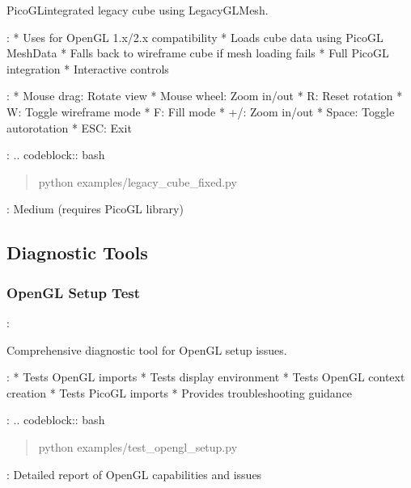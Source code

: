 \documentclass[a4paper,10pt,english,openany,oneside]{sphinxmanual}
\begin{document}
\sphinxAtStartPar
PicoGL\sphinxhyphen{}integrated legacy cube using LegacyGLMesh.

\sphinxAtStartPar
{}:
* Uses  for OpenGL 1.x/2.x compatibility
* Loads cube data using PicoGL MeshData
* Falls back to wireframe cube if mesh loading fails
* Full PicoGL integration
* Interactive controls

\sphinxAtStartPar
{}:
* Mouse drag: Rotate view
* Mouse wheel: Zoom in/out
* R: Reset rotation
* W: Toggle wireframe mode
* F: Fill mode
* +/\sphinxhyphen{}: Zoom in/out
* Space: Toggle auto\sphinxhyphen{}rotation
* ESC: Exit

\sphinxAtStartPar
{}:
.. code\sphinxhyphen{}block:: bash
\begin{quote}

\sphinxAtStartPar
python examples/legacy\_cube\_fixed.py
\end{quote}

\sphinxAtStartPar
{}: Medium (requires PicoGL library)


\subsection{Diagnostic Tools}
\label{\detokenize{legacy_examples:diagnostic-tools}}

\subsubsection{OpenGL Setup Test}
\label{\detokenize{legacy_examples:opengl-setup-test}}
\sphinxAtStartPar
{}: 

\sphinxAtStartPar
Comprehensive diagnostic tool for OpenGL setup issues.

\sphinxAtStartPar
{}:
* Tests OpenGL imports
* Tests display environment
* Tests OpenGL context creation
* Tests PicoGL imports
* Provides troubleshooting guidance

\sphinxAtStartPar
{}:
.. code\sphinxhyphen{}block:: bash
\begin{quote}

\sphinxAtStartPar
python examples/test\_opengl\_setup.py
\end{quote}

\sphinxAtStartPar
{}: Detailed report of OpenGL capabilities and issues
\end{document}
